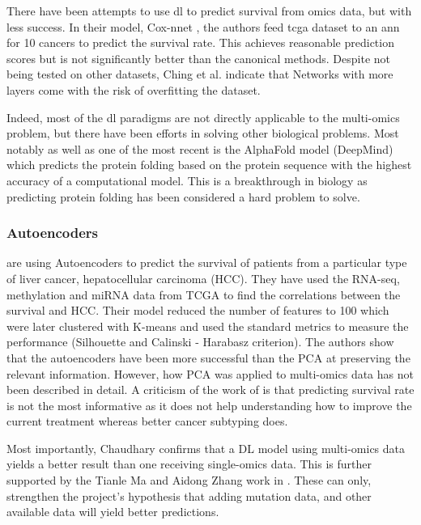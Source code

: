 There have been attempts to use \acrshort{dl} to predict survival from omics data, but with less success. In their model, Cox-nnet \cite{Ching2018-gq}, the authors feed \acrshort{tcga} dataset to an \acrshort{ann} for 10 cancers to predict the survival rate. This achieves reasonable prediction scores but is not significantly better than the canonical methods. Despite not being tested on other datasets, Ching et al. indicate that Networks with more layers come with the risk of overfitting the dataset.  


Indeed, most of the \acrshort{dl} paradigms are not directly applicable to the multi-omics problem, but there have been efforts in solving other biological problems. Most notably as well as one of the most recent is the AlphaFold model\cite{Jumper2021-du} (DeepMind) which predicts the protein folding based on the protein sequence with the highest accuracy of a computational model. This is a breakthrough in biology as predicting protein folding has been considered a hard problem to solve.


\subsubsection{Autoencoders} \label{s:autoencoders}

\citet{Chaudhary2018-qj} are using Autoencoders to predict the survival of patients from a particular type of liver cancer, hepatocellular carcinoma (HCC). They have used the RNA-seq, methylation and miRNA data from TCGA to find the correlations between the survival and HCC. Their model reduced the number of features to 100 which were later clustered with K-means and used the standard metrics to measure the performance (Silhouette and Calinski - Harabasz criterion). The authors show that the autoencoders have been more successful than the PCA at preserving the relevant information. However, how PCA was applied to multi-omics data has not been described in detail. A criticism of the work of \citet{Chaudhary2018-qj} is that predicting survival rate is not the most informative as it does not help understanding how to improve the current treatment whereas better cancer subtyping does.

Most importantly, Chaudhary confirms that a DL model using multi-omics data yields a better result than one receiving single-omics data. This is further supported by the Tianle Ma and Aidong Zhang work in \cite{Ma2019-hk}. These can only, strengthen the project's hypothesis that adding mutation data, and other available data will yield better predictions.

